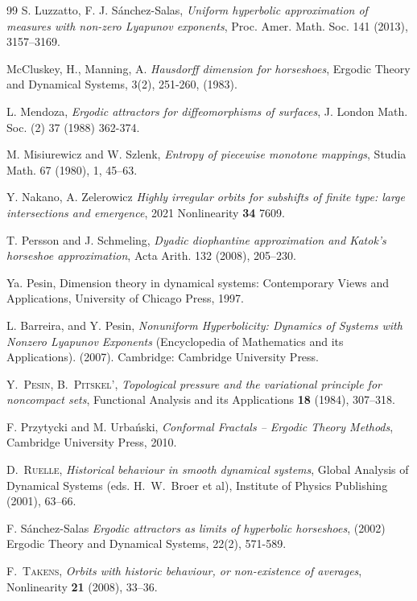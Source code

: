 \documentclass{amsart}
\theoremstyle{plain}
\theoremstyle{definition}
\theoremstyle{remark}
\numberwithin{equation}{section}
\begin{document}
\begin{thebibliography}{99}
S. Luzzatto, F. J. S\'anchez-Salas, \emph{Uniform hyperbolic approximation of measures with
non-zero Lyapunov exponents}, Proc. Amer. Math. Soc. 141 (2013), 3157–3169.

McCluskey, H., Manning, A. \emph{Hausdorff dimension for horseshoes}, Ergodic Theory and Dynamical Systems, 3(2), 251-260, (1983).


L. Mendoza, \emph{Ergodic attractors for diffeomorphisms of surfaces}, J. London Math. Soc. (2) 37 (1988) 362-374.

M. Misiurewicz and W. Szlenk, \emph{Entropy of piecewise monotone mappings}, Studia
Math. 67 (1980), 1, 45–63.

Y. Nakano, A. Zelerowicz \emph{Highly irregular orbits for subshifts of finite type: large intersections and emergence},  2021 Nonlinearity \textbf{34} 7609.

T. Persson and J. Schmeling, \emph{Dyadic diophantine approximation and Katok’s horseshoe approximation}, Acta Arith. 132 (2008), 205–230.	

Ya. Pesin, 
Dimension theory in dynamical systems: Contemporary Views and Applications, 
University of  Chicago  Press, 
1997.


L. Barreira, and Y. Pesin,  \emph{Nonuniform Hyperbolicity: Dynamics of Systems with Nonzero Lyapunov Exponents} (Encyclopedia of Mathematics and its Applications).  (2007). Cambridge: Cambridge University Press.

\textsc{Y.~Pesin, B.~Pitskel'}, 
\textit{Topological pressure and the variational principle for noncompact sets}, 
Functional Analysis and its Applications
\textbf{18} (1984), 
307--318. 

F. Przytycki and M. Urba\'nski, \emph{Conformal Fractals – Ergodic Theory Methods}, Cambridge University Press, 2010.

\textsc{D.~Ruelle},
\textit{Historical behaviour in smooth dynamical systems},
Global Analysis of Dynamical Systems 
(eds. H.~W.~Broer et al),
Institute of Physics Publishing
(2001), 
63--66.

F. S\'anchez-Salas \emph{Ergodic attractors as limits of hyperbolic horseshoes}, (2002)  Ergodic Theory and Dynamical Systems, 22(2), 571-589.

\textsc{F.~Takens},
\textit{Orbits with historic behaviour, or non-existence of averages},
Nonlinearity
\textbf{21}  (2008), 
33--36.


\end{thebibliography}
\end{document}
